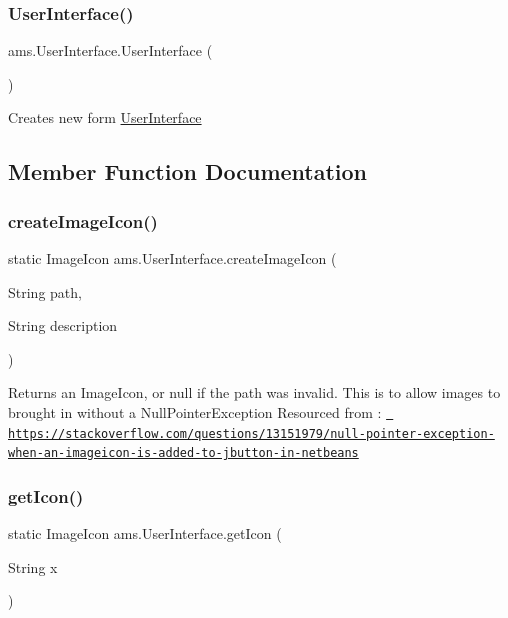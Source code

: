 \subsubsection{\texorpdfstring{UserInterface()}{UserInterface()}}
{\footnotesize\ttfamily ams.\+User\+Interface.\+User\+Interface (\begin{DoxyParamCaption}{ }\end{DoxyParamCaption})}

Creates new form \mbox{\hyperlink{classams_1_1_user_interface}{User\+Interface}} 

\subsection{Member Function Documentation}
\mbox{\label{classams_1_1_user_interface_ab22216d30202f196e243447004ef51cd}} 
\subsubsection{\texorpdfstring{createImageIcon()}{createImageIcon()}}
{\footnotesize\ttfamily static Image\+Icon ams.\+User\+Interface.\+create\+Image\+Icon (\begin{DoxyParamCaption}\item[{String}]{path,  }\item[{String}]{description }\end{DoxyParamCaption})\hspace{0.3cm}{\ttfamily [static]}}

Returns an Image\+Icon, or null if the path was invalid. This is to allow images to brought in without a Null\+Pointer\+Exception Resourced from \+: \href{https://stackoverflow.com/questions/13151979/null-pointer-exception-when-an-imageicon-is-added-to-jbutton-in-netbeans}{\texttt{ https\+://stackoverflow.\+com/questions/13151979/null-\/pointer-\/exception-\/when-\/an-\/imageicon-\/is-\/added-\/to-\/jbutton-\/in-\/netbeans}} \mbox{\label{classams_1_1_user_interface_a6d65a19f7a850d64f969d516ec4b7642}} 
\subsubsection{\texorpdfstring{getIcon()}{getIcon()}}
{\footnotesize\ttfamily static Image\+Icon ams.\+User\+Interface.\+get\+Icon (\begin{DoxyParamCaption}\item[{String}]{x }\end{DoxyParamCaption})\hspace{0.3cm}{\ttfamily [static]}}


